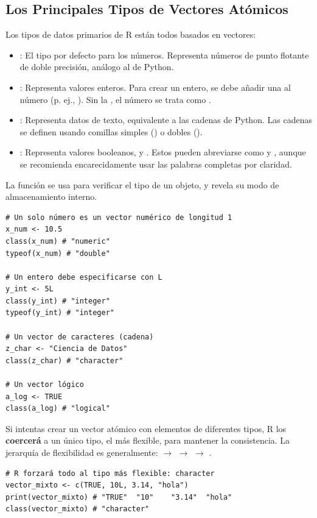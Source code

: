\subsection*{Los Principales Tipos de Vectores Atómicos}
Los tipos de datos primarios de R están todos basados en vectores:
\begin{itemize}
    \item \textbf{}: El tipo por defecto para los números. Representa números de punto flotante de doble precisión, análogo al  de Python.
    \item \textbf{}: Representa valores enteros. Para crear un entero, se debe añadir una  al número (p. ej., ). Sin la , el número se trata como .
    \item \textbf{}: Representa datos de texto, equivalente a las cadenas de Python. Las cadenas se definen usando comillas simples () o dobles ().
    \item \textbf{}: Representa valores booleanos,  y . Estos pueden abreviarse como  y , aunque se recomienda encarecidamente usar las palabras completas por claridad.
\end{itemize}

\begin{example}
La función  se usa para verificar el tipo de un objeto, y  revela su modo de almacenamiento interno.
\begin{verbatim}
# Un solo número es un vector numérico de longitud 1
x_num <- 10.5
class(x_num) # "numeric"
typeof(x_num) # "double"

# Un entero debe especificarse con L
y_int <- 5L
class(y_int) # "integer"
typeof(y_int) # "integer"

# Un vector de caracteres (cadena)
z_char <- "Ciencia de Datos"
class(z_char) # "character"

# Un vector lógico
a_log <- TRUE
class(a_log) # "logical"
\end{verbatim}
\end{example}

\begin{remark}
Si intentas crear un vector atómico con elementos de diferentes tipos, R los \textbf{coercerá} a un único tipo, el más flexible, para mantener la consistencia. La jerarquía de flexibilidad es generalmente:  $\to$  $\to$  $\to$ .
\begin{verbatim}
# R forzará todo al tipo más flexible: character
vector_mixto <- c(TRUE, 10L, 3.14, "hola")
print(vector_mixto) # "TRUE"  "10"    "3.14"  "hola"
class(vector_mixto) # "character"
\end{verbatim}
\end{remark}


